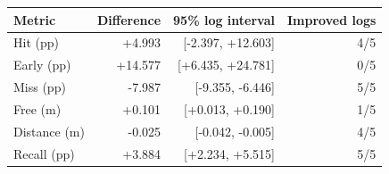 \begin{tabular}{lrrr}
\toprule
Metric & Difference & 95\% log interval & Improved logs \\
\midrule
Hit (pp) & +4.993 & [-2.397, +12.603] & 4/5 \\
Early (pp) & +14.577 & [+6.435, +24.781] & 0/5 \\
Miss (pp) & -7.987 & [-9.355, -6.446] & 5/5 \\
Free (m) & +0.101 & [+0.013, +0.190] & 1/5 \\
Distance (m) & -0.025 & [-0.042, -0.005] & 4/5 \\
Recall (pp) & +3.884 & [+2.234, +5.515] & 5/5 \\
\bottomrule
\end{tabular}
